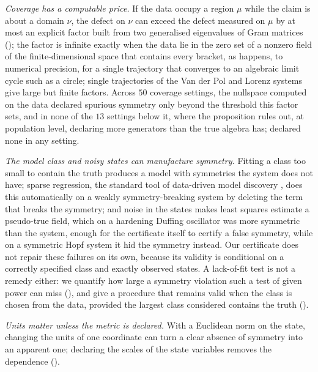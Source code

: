 \emph{Coverage has a computable price.} If the data occupy a region $\mu$
while the claim is about a domain $\nu$, the defect on $\nu$ can exceed the
defect measured on $\mu$ by at most an explicit factor built from two
generalised eigenvalues of Gram matrices (); the factor is
infinite exactly when the data lie in the zero set of a nonzero field of the
finite-dimensional space that contains every bracket, as happens, to numerical
precision, for a single trajectory that converges to an algebraic limit cycle
such as a circle; single trajectories of the Van der Pol and Lorenz systems
give large but finite factors. Across $50$ coverage settings, the nullspace
computed on the data declared spurious symmetry only beyond the threshold this
factor sets, and in none of the $13$ settings below it, where the proposition
rules out, at population level, declaring more generators than the true
algebra has; \symcert{} declared none in any setting.

\emph{The model class and noisy states can manufacture symmetry.} Fitting a
class too small to contain the truth produces a model with symmetries the
system does not have; sparse regression, the standard tool of data-driven model
discovery \citep{brunton2016discovering}, does this automatically on a weakly
symmetry-breaking system by deleting the term that breaks the symmetry; and
noise in the states makes least squares estimate a pseudo-true field, which on
a hardening Duffing oscillator was more symmetric than the system, enough for
the certificate itself to certify a false symmetry, while on a symmetric Hopf
system it hid the symmetry instead. Our certificate does not repair these
failures on its own, because its validity is conditional on a correctly
specified class and exactly observed states. A lack-of-fit test is not a
remedy either: we quantify how large a symmetry violation such a test of given
power can miss (), and give a procedure that remains valid when the class is
chosen from the data, provided the largest class considered contains the truth
().

\emph{Units matter unless the metric is declared.} With a Euclidean norm on
the state, changing the units of one coordinate can turn a clear absence of
symmetry into an apparent one; declaring the scales of the state variables
removes the dependence ().

